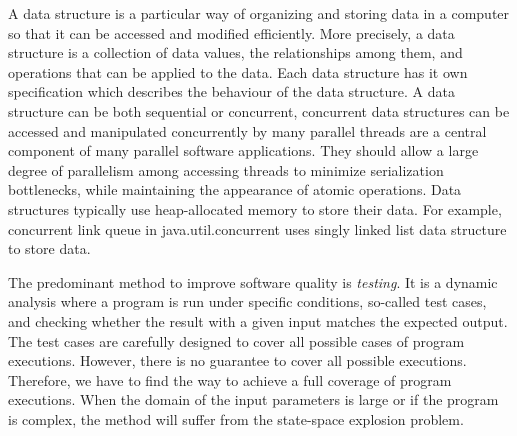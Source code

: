 A data structure is a particular way of organizing and storing data in a computer so that it can be accessed and modified efficiently. More precisely, a data structure is a collection of data values, the relationships among them, and operations that can be applied to the data. Each data structure has it own specification which describes the behaviour of the data structure. A data structure can be both sequential or concurrent, concurrent data structures can be accessed and manipulated concurrently by many parallel threads are a central component of many parallel software applications. They should allow a large degree of parallelism among accessing threads to minimize serialization bottlenecks, while maintaining the appearance of atomic operations. Data structures typically use heap-allocated memory to store their data. For example, concurrent link queue in java.util.concurrent uses singly linked list data structure to store data.   





The predominant method to improve software quality is
\emph{testing}. It is a dynamic analysis where a program is run under specific conditions, so-called test cases, and checking
whether the result with a given input matches the expected output.
%
The test cases are carefully designed to cover all possible cases of program executions.
%
However, there is no guarantee to cover all possible executions. Therefore, we have to find the way to achieve a full coverage of program executions. When the domain of the input parameters is large or if the program is
complex, the method will suffer from the state-space explosion
problem.%
%

